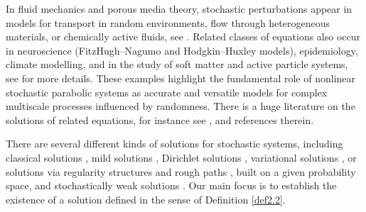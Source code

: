 \documentclass[english,a4paper,11pt]{amsart}
\theoremstyle{plain}
\theoremstyle{definition}
\theoremstyle{remark}
\numberwithin{equation}{section}
\begin{document}
	In fluid mechanics and porous media 
	theory, stochastic perturbations appear in models for transport in random 
	environments, flow through heterogeneous materials, or chemically active 
	fluids, see \cite{DGG2020,Gess2017,DMEHAZ,vazquez2007porous}. Related classes of equations also occur in neuroscience (FitzHugh--Nagumo and Hodgkin--Huxley models), epidemiology, climate modelling, 
	and in the study of soft matter and active particle systems, see \cite{RF,AGHM,GrayScott_original,ALH,EFK,JNSA,YY} for more details. These examples 
	highlight the fundamental role of nonlinear stochastic parabolic systems as 
	accurate and versatile models for complex multiscale processes influenced by 
	randomness. There is a huge literature on the solutions of related equations, for instance see \cite{BDPR3,BDPR2016,BM2013,Cao,Capinski1993,HE,DGG2020,evans2012introduction,FehrmanGess2021,Flandoli,franco,Gess2017,kotelenez,TessitoreZabczyk1998}, and references therein. 
	
	There are several different kinds of solutions for stochastic systems, including classical solutions \cite{GDPMR}, mild solutions \cite{JBW}, Dirichlet solutions \cite{SAMR}, variational solutions \cite{GDPMR}, or solutions via regularity structures and rough paths \cite{MH2014}, \cite{JLL,MGCPLL,ethier} built on a given probability space, and stochastically weak solutions \cite{MV}. 
	Our main focus is to establish the existence of a solution defined in the sense of Definition \ref{def2.2}.
\end{document}
